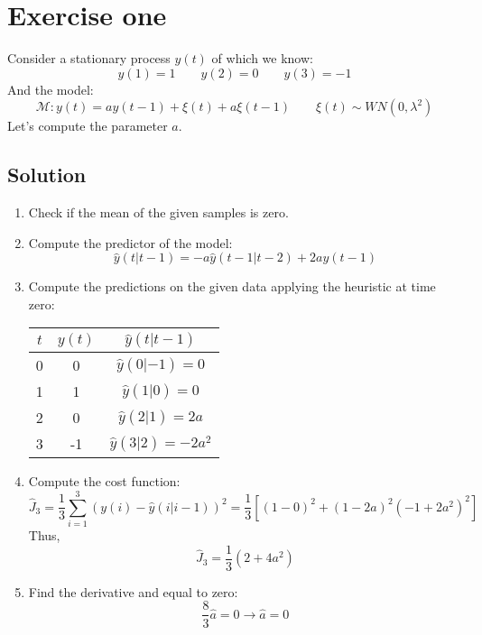 \section{Exercise one}

Consider a stationary process $y(t)$ of which we know: 
\[y(1)=1 \qquad y(2)=0 \qquad y(3)=-1\]
And the model: 
\[\mathcal{M}:y(t)=ay(t-1)+\xi(t)+a\xi(t-1)\qquad \xi(t)\sim WN(0,\lambda^2)\]
Let's compute the parameter $a$. 

\subsection*{Solution}
\begin{enumerate}
    \item Check if the mean of the given samples is zero.
    \item Compute the predictor of the model:
        \[\hat{y}(t|t-1)=-a\hat{y}(t-1|t-2)+2ay(t-1)\]
    \item Compute the predictions on the given data applying the heuristic at time zero:
        \begin{table}[H]
            \centering
            \begin{tabular}{ccc}
            \hline
            $t$ & $y(t)$ & $\hat{y}(t|t-1)$     \\ \hline
            0   & 0      & $\hat{y}(0|-1)=0$    \\
            1   & 1      & $\hat{y}(1|0)=0$     \\
            2   & 0      & $\hat{y}(2|1)=2a$    \\
            3   & -1     & $\hat{y}(3|2)=-2a^2$ \\ \hline
            \end{tabular}
        \end{table}
    \item Compute the cost function: 
        \[\hat{J}_3=\dfrac{1}{3}\sum_{i=1}^{3}\left(y(i)-\hat{y}(i|i-1)\right)^2=\dfrac{1}{3}\left[\left(1-0\right)^2+\left(1-2a\right)^2\left(-1+2a^2\right)^2\right]\]
        Thus, 
        \[\hat{J}_3=\dfrac{1}{3}\left(2+4a^2\right)\]
    \item Find the derivative and equal to zero: 
        \[\dfrac{8}{3}\hat{a}=0\rightarrow \hat{a}=0\]
\end{enumerate}